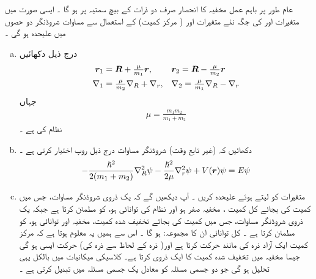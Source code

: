 عام طور پر  باہم عمل  مخفیہ  کا  انحصار صرف دو  ذرات کے بیچ سمتیہ  پر ہو گا ۔ ایسی صورت میں متغیرات   اور   کی جگہ نئے  متغیرات    اور
( مرکز کمیت)  کے  استعمال سے  مساوات شروڈنگر دو  حصوں  میں علیحدہ ہو گی ۔  
\begin{enumerate}[a.]
\item
درج ذیل   دکھائیں
\begin{align*}
 {\ensuremath{{\boldsymbol{r}}}}_1 &= {{\boldsymbol{R}}} + \tfrac{ \mu}{m_1}{{\boldsymbol{r}}}, && {{\boldsymbol{r}}}_2 = {{\boldsymbol{R}}} - \tfrac{ \mu }{ m_2 } {{\boldsymbol{r}}}\\
  \nabla_1& = \tfrac{ \mu }{ m_2 }\nabla_R + \nabla_r , &&  \nabla_2 = \tfrac{ \mu }{ m_1 } \nabla_R - \nabla_r
\end{align*}
جہاں 
\begin{align}\label{مساوات_متماثل_تخفیف_شدہ_کمیت}
\mu = \frac{ m_1 m_2 }{ m_1 + m_2 }
\end{align}
نظام کی   ہے ۔
\item 
  دکھائیں کہ (غیر تابع وقت)  شروڈنگر  مساوات درج ذیل روپ اختیار کرتی ہے ۔
\begin{align*}
- \frac{ \hslash^2 }{ 2 ( m_1 + m_2 ) } \nabla_R^2  \psi - \frac{ \hslash^2 }{ 2 \mu }\nabla_r^2 { \psi } + V({{\boldsymbol{r}}}) \psi = E \psi
\end{align*}
\item
 متغیرات کو   لیتے ہوئے علیحدہ کریں ۔ آپ دیکھیں گے کہ    یک ذروی  شروڈنگر مساوات، جس میں کمیت  کی بجائے  کل کمیت  ، مخفیہ  صفر ہو اور نظام کی توانائی   ہو،   کو مطمئن کرتا ہے  جبکہ   یک ذروی  شروڈنگر مساوات، جس میں کمیت  کی بجائے  تخفیف شدہ کمیت، مخفیہ    اور توانائی  ہو، کو مطمئن کرتا ہے ۔ کل توانائی  ان کا مجموعہ:    ہو گا ۔ اس سے ہمیں یہ معلوم ہوتا ہے  کہ مرکز  کمیت ایک آزاد ذرہ کی مانند  حرکت کرتا ہے اور(  ذرہ   کے لحاظ سے ذرہ    کی)   حرکت ایسی  ہو گی جیسا مخفیہ  میں تخفیف شدہ کمیت کا ایک ذروی  کرتا ہے۔ کلاسیکی میکانیات میں  بالکل یہی تحلیل ہو گی    جو دو  جسمی  مسئلہ کو معادل یک جسمی مسئلہ میں  تبدیل کرتی ہے ۔ 
\end{enumerate}
